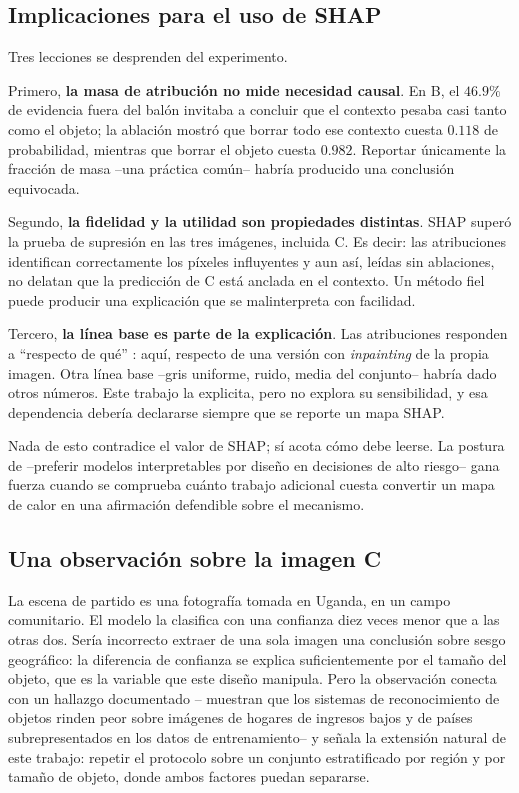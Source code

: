 \documentclass[11pt]{article}
\begin{document}
\subsection{Implicaciones para el uso de SHAP}

Tres lecciones se desprenden del experimento.

Primero, \textbf{la masa de atribución no mide necesidad causal}. En B, el $46.9\%$ de
evidencia fuera del balón invitaba a concluir que el contexto pesaba casi tanto como el
objeto; la ablación mostró que borrar todo ese contexto cuesta $0.118$ de probabilidad,
mientras que borrar el objeto cuesta $0.982$. Reportar únicamente la fracción de masa
--una práctica común-- habría producido una conclusión equivocada.

Segundo, \textbf{la fidelidad y la utilidad son propiedades distintas}. SHAP superó la
prueba de supresión en las tres imágenes, incluida C. Es decir: las atribuciones
identifican correctamente los píxeles influyentes y aun así, leídas sin ablaciones, no
delatan que la predicción de C está anclada en el contexto. Un método fiel puede
producir una explicación que se malinterpreta con facilidad.

Tercero, \textbf{la línea base es parte de la explicación}. Las atribuciones responden
a ``respecto de qué'' \citep{sundararajan2020many, kumar2020problems}: aquí, respecto de
una versión con \emph{inpainting} de la propia imagen. Otra línea base --gris uniforme,
ruido, media del conjunto-- habría dado otros números. Este trabajo la explicita, pero
no explora su sensibilidad, y esa dependencia debería declararse siempre que se reporte
un mapa SHAP.

Nada de esto contradice el valor de SHAP; sí acota cómo debe leerse. La postura de
\citet{rudin2019stop} --preferir modelos interpretables por diseño en decisiones de
alto riesgo-- gana fuerza cuando se comprueba cuánto trabajo adicional cuesta
convertir un mapa de calor en una afirmación defendible sobre el mecanismo.

\subsection{Una observación sobre la imagen C}

La escena de partido es una fotografía tomada en Uganda, en un campo comunitario. El
modelo la clasifica con una confianza diez veces menor que a las otras dos. Sería
incorrecto extraer de una sola imagen una conclusión sobre sesgo geográfico: la
diferencia de confianza se explica suficientemente por el tamaño del objeto, que es la
variable que este diseño manipula. Pero la observación conecta con un hallazgo
documentado --\citet{devries2019does} muestran que los sistemas de reconocimiento de
objetos rinden peor sobre imágenes de hogares de ingresos bajos y de países
subrepresentados en los datos de entrenamiento-- y señala la extensión natural de este
trabajo: repetir el protocolo sobre un conjunto estratificado por región y por tamaño
de objeto, donde ambos factores puedan separarse.
\end{document}
